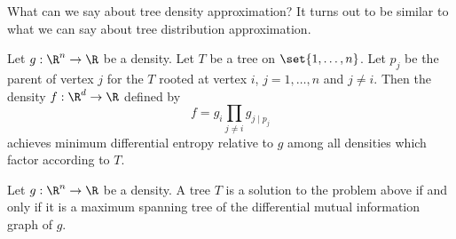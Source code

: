 

What can we say about tree density approximation? It turns out to be similar to what we can say about tree distribution approximation.


\begin{prop}
  Let $g: \R^n \to \R$ be a density.
  Let $T$ be
  a tree on $\set{1, \dots, n}$.
  Let $p_j$ be
  the parent of vertex $j$ for the $T$ rooted
  at vertex $i$, $j = 1,\dots,n$ and $j \neq i$.
  Then the density $f: \R^d \to \R$ defined by
  \[
    f = g_i \prod_{j \neq i} g_{j \mid p_j}
  \]
  achieves minimum differential entropy relative to $g$ among
  all densities which factor according to $T$.
\end{prop}

\begin{prop}
  Let $g: \R^n \to \R$ be a density.
  A tree $T$ is a solution to the problem above
  if and only if it is a maximum spanning
  tree of the differential mutual information graph of $g$.
\end{prop}


